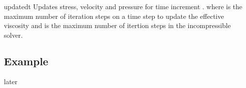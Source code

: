 \begin{methoddesc}[IncompressibleIsotropicFlowCartesian]{update}{dt
}
Updates stress, velocity and pressure for time increment .
where  is the maximum number of iteration steps on a time step to
update the effective viscosity and  is the maximum
number of itertion steps in the incompressible solver.
\end{methoddesc}

\subsection{Example}
later



